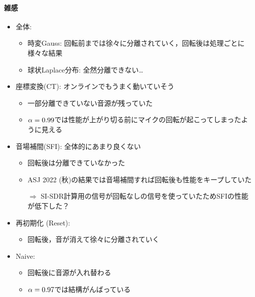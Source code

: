 \documentclass[twocolumn,9pt,dvipdfmx]{article}
\begin{document}
\paragraph{雑感}
\begin{itemize}
  \item 全体:
    \begin{itemize}
      \item 時変Gauss: 回転前までは徐々に分離されていく，回転後は処理ごとに様々な結果
      \item 球状Laplace分布: 全然分離できない…
    \end{itemize}
  \item 座標変換(CT): オンラインでもうまく動いていそう
    \begin{itemize}
      \item 一部分離できていない音源が残っていた
      \item $\alpha=0.99$では性能が上がり切る前にマイクの回転が起こってしまったように見える
    \end{itemize}
  \item 音場補間(SFI): 全体的にあまり良くない
    \begin{itemize}
      \item 回転後は分離できていなかった
      \item ASJ 2022 (秋)の結果では音場補間すれば回転後も性能をキープしていた
      \item[$\Rightarrow$] SI-SDR計算用の信号が回転なしの信号を使っていたためSFIの性能が低下した？
    \end{itemize}
  \item 再初期化 (Reset):
    \begin{itemize}
      \item 回転後，音が消えて徐々に分離されていく
    \end{itemize}
  \item Naive:
    \begin{itemize}
      \item 回転後に音源が入れ替わる
      \item $\alpha=0.97$では結構がんばっている
    \end{itemize}
\end{itemize}
\end{document}
